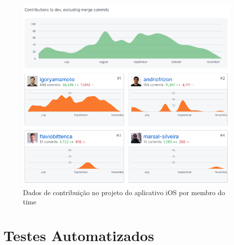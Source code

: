 \begin{figure}[H]
    \centering
    \includegraphics[width=\textwidth]{pfc/figuras/github-stats.png}
    \caption{Dados de contribuição no projeto do aplicativo iOS por membro do time}
    \label{fig:github-stats}
\end{figure}

\section{Testes Automatizados}
